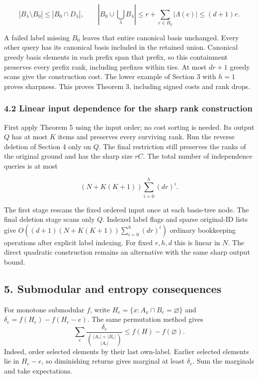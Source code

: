 \[
|B_\lambda\setminus B_0|\le|B_0\cap D_\lambda|,
\qquad
\left|B_0\cup\bigcup_\lambda B_\lambda\right|
 \le r+\sum_{e\in B_0}|\Lambda(e)|\le(d+1)r.
\]

A failed label missing \(B_0\) leaves that entire canonical basis unchanged. Every other query has its canonical basis included in the retained union. Canonical greedy basis elements in each prefix span that prefix, so this containment preserves every prefix rank, including prefixes within ties. At most \(dr+1\) greedy scans give the construction cost. The lower example of Section 3 with \(h=1\) proves sharpness. This proves Theorem 3, including signed costs and rank drops.

\hypertarget{af-240b5086c5-linear-input-dependence-for-the-sharp-rank-construction}{%
\subsubsection{4.2 Linear input dependence for the sharp rank construction}\label{af-240b5086c5-linear-input-dependence-for-the-sharp-rank-construction}}

First apply Theorem 5 using the input order; no cost sorting is needed. Its output \(Q\) has at most \(K\) items and preserves every surviving rank. Run the reverse deletion of Section 4 only on \(Q\). The final restriction still preserves the ranks of the original ground and has the sharp size \(rC\). The total number of independence queries is at most

\[
(N+K(K+1))\sum_{i=0}^{h}(dr)^i.
\]

The first stage rescans the fixed ordered input once at each basis-tree node. The final deletion stage scans only \(Q\). Indexed label flags and sparse original-ID lists give \(O((d+1)(N+K(K+1))\sum_{i=0}^{h}(dr)^i)\) ordinary bookkeeping operations after explicit label indexing. For fixed \(r,h,d\) this is linear in \(N\). The direct quadratic construction remains an alternative with the same sharp output bound.

\hypertarget{af-240b5086c5-submodular-and-entropy-consequences}{%
\subsection{5. Submodular and entropy consequences}\label{af-240b5086c5-submodular-and-entropy-consequences}}

For monotone submodular \(f\), write \(H_e=\{x:A_x\cap B_e=\varnothing\}\) and \(\delta_e=f(H_e)-f(H_e-e)\). The same permutation method gives \[
\sum_e\frac{\delta_e}{\binom{|A_e|+|B_e|}{|A_e|}}\le f(H)-f(\varnothing).
\] Indeed, order selected elements by their last own-label. Earlier selected elements lie in \(H_e-e\), so diminishing returns gives marginal at least \(\delta_e\). Sum the marginals and take expectations.

